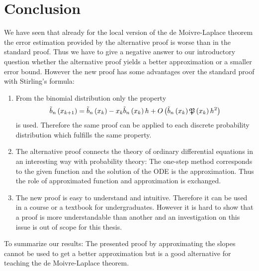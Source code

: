 \chapter{Conclusion}

We have seen that already for the local version of the de Moivre-Laplace theorem the error estimation provided by the alternative proof is worse than in the standard proof. Thus we have to give a negative answer to our introductory question whether the alternative proof yields a better approximation or a smaller error bound. However the new proof has some advantages over the standard proof with Stirling's formula:

\begin{enumerate}
  \item From the binomial distribution only the property
    \begin{align}
      \bb{\x[k+1]} = \bb{\x[k]} - \x[k]\bb{\x[k]} h + \bigo{\bb{\x[k]} \pol{\x[k]} h^2}
    \end{align}
    is used. Therefore the same proof can be applied to each discrete probability distribution which fulfills the same property.

  \item The alternative proof connects the theory of ordinary differential equations in an interesting way with probability theory: The one-step method corresponds to the given function and the solution of the ODE is the approximation. Thus the role of approximated function and approximation is exchanged.

  \item The new proof is easy to understand and intuitive. Therefore it can be used in a course or a textbook for undergraduates. However it is hard to show that a proof is more understandable than another \cite{tampis:understandability} and an investigation on this issue is out of scope for this thesis. 
\end{enumerate}

To summarize our results: The presented proof by approximating the slopes cannot be used to get a better approximation but is a good alternative for teaching the de Moivre-Laplace theorem.
